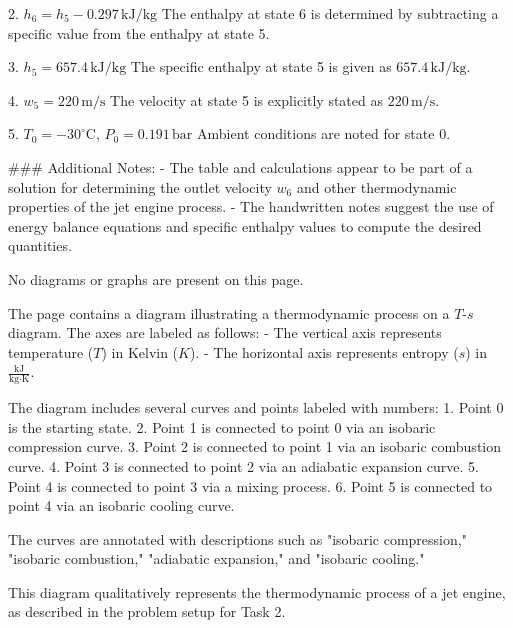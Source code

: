 2. \( h_6 = h_5 - 0.297 \, \text{kJ/kg} \)  
   The enthalpy at state 6 is determined by subtracting a specific value from the enthalpy at state 5.  

3. \( h_5 = 657.4 \, \text{kJ/kg} \)  
   The specific enthalpy at state 5 is given as \( 657.4 \, \text{kJ/kg} \).  

4. \( w_5 = 220 \, \text{m/s} \)  
   The velocity at state 5 is explicitly stated as \( 220 \, \text{m/s} \).  

5. \( T_0 = -30^\circ\text{C} \), \( P_0 = 0.191 \, \text{bar} \)  
   Ambient conditions are noted for state 0.  

### Additional Notes:
- The table and calculations appear to be part of a solution for determining the outlet velocity \( w_6 \) and other thermodynamic properties of the jet engine process.  
- The handwritten notes suggest the use of energy balance equations and specific enthalpy values to compute the desired quantities.  

No diagrams or graphs are present on this page.

The page contains a diagram illustrating a thermodynamic process on a \( T \)-\( s \) diagram. The axes are labeled as follows:  
- The vertical axis represents temperature (\( T \)) in Kelvin (\( K \)).  
- The horizontal axis represents entropy (\( s \)) in \( \frac{\text{kJ}}{\text{kg·K}} \).  

The diagram includes several curves and points labeled with numbers:  
1. Point 0 is the starting state.  
2. Point 1 is connected to point 0 via an isobaric compression curve.  
3. Point 2 is connected to point 1 via an isobaric combustion curve.  
4. Point 3 is connected to point 2 via an adiabatic expansion curve.  
5. Point 4 is connected to point 3 via a mixing process.  
6. Point 5 is connected to point 4 via an isobaric cooling curve.  

The curves are annotated with descriptions such as "isobaric compression," "isobaric combustion," "adiabatic expansion," and "isobaric cooling."  

This diagram qualitatively represents the thermodynamic process of a jet engine, as described in the problem setup for Task 2.